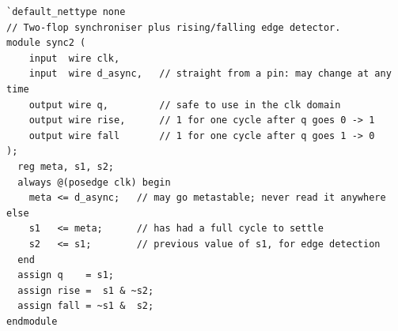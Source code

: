 \begin{center}
\end{center}

{\small
\begin{verbatim}
`default_nettype none
// Two-flop synchroniser plus rising/falling edge detector.
module sync2 (
    input  wire clk,
    input  wire d_async,   // straight from a pin: may change at any time
    output wire q,         // safe to use in the clk domain
    output wire rise,      // 1 for one cycle after q goes 0 -> 1
    output wire fall       // 1 for one cycle after q goes 1 -> 0
);
  reg meta, s1, s2;
  always @(posedge clk) begin
    meta <= d_async;   // may go metastable; never read it anywhere else
    s1   <= meta;      // has had a full cycle to settle
    s2   <= s1;        // previous value of s1, for edge detection
  end
  assign q    = s1;
  assign rise =  s1 & ~s2;
  assign fall = ~s1 &  s2;
endmodule
\end{verbatim}
}

